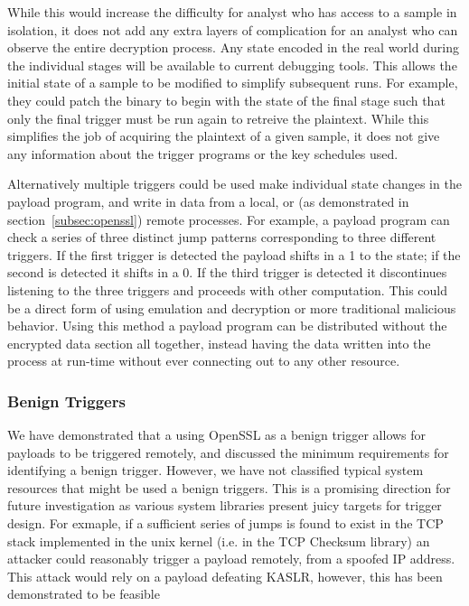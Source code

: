 While this would increase the difficulty for analyst  who has access to a sample
in isolation, it  does not add any extra layers of complication for an analyst
who can observe the entire decryption process. Any state encoded in the real
world during the individual stages will be available to current debugging tools.
This allows the initial state of a sample to be modified to simplify subsequent
runs. For example, they could patch the binary to begin with the state of the
final stage such that only the final trigger must be run again to retreive the
plaintext. While this simplifies the job of acquiring the plaintext of a given
\speculake sample, it does not give any information about the trigger programs
or the key schedules used. 

\smallskip

Alternatively multiple triggers could be used make individual state changes in
the payload program, and write in data from a local, or (as demonstrated in
section~\ref{subsec:openssl}) remote processes. For example, a payload program
can check a series of three distinct jump patterns corresponding to three
different triggers. If the first trigger is detected the payload shifts in a 1
to the state; if the second is detected it shifts in a 0. If the third trigger
is detected it discontinues listening to the three triggers and proceeds with
other computation. This could be a direct form of \speculake using emulation and
decryption or more traditional malicious behavior. Using this method a payload
program can be distributed without the encrypted data section all together,
instead having the data written into the process at run-time without ever
connecting out to any other resource. 

\subsubsection{Benign Triggers}
We have demonstrated that a using OpenSSL as a benign trigger allows for
\speculake payloads to be triggered remotely, and discussed the minimum
requirements for identifying a benign trigger. However, we have not classified
typical system resources that might be used a benign triggers. This is a
promising direction for future investigation as various system libraries present
juicy targets for trigger design. For exmaple, if a sufficient series of jumps
is found to exist in the TCP stack implemented in the unix kernel (i.e. in the
TCP Checksum library) an attacker could reasonably trigger a \speculake payload
remotely, from a spoofed IP address. This attack would rely on a payload
defeating KASLR, however, this has been demonstrated to be
feasible~\cite{gruss2017kaslr,evtyushkin2016jump}

